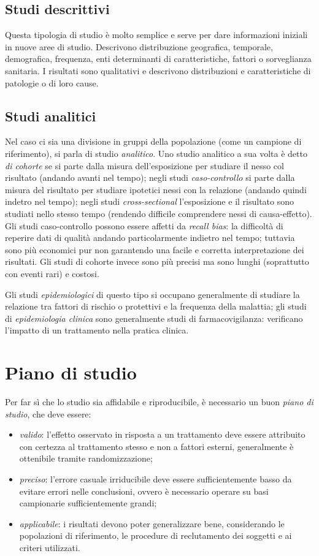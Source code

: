 \documentclass[a4page, twocolumn]{article}
\begin{document}
\subsection{Studi descrittivi}
Questa tipologia di studio è molto semplice e serve per dare informazioni iniziali in nuove aree di studio.
Descrivono distribuzione geografica, temporale, demografica, frequenza, enti determinanti di caratteristiche, fattori o sorveglianza sanitaria.
I risultati sono qualitativi e descrivono distribuzioni e caratteristiche di patologie o di loro cause.

\subsection{Studi analitici}
Nel caso ci sia una divisione in gruppi della popolazione (come un campione di riferimento), si parla di studio \textit{analitico}.
Uno studio analitico a sua volta è detto \textit{di cohorte} se si parte dalla misura dell'esposizione per studiare il nesso col risultato (andando avanti nel tempo); negli studi \textit{caso-controllo} si parte dalla misura del risultato per studiare ipotetici nessi con la relazione (andando quindi indetro nel tempo); negli studi \textit{cross-sectional} l'esposizione e il risultato sono studiati nello stesso tempo (rendendo difficile comprendere nessi di causa-effetto).
Gli studi caso-controllo possono essere affetti da \textit{recall bias}: la difficoltà di reperire dati di qualità andando particolarmente indietro nel tempo; tuttavia sono più economici pur non garantendo una facile e corretta interpretazione dei risultati.
Gli studi di cohorte invece sono più precisi ma sono lunghi (soprattutto con eventi rari) e costosi.

Gli studi \textit{epidemiologici} di questo tipo si occupano generalmente di studiare la relazione tra fattori di rischio o protettivi e la frequenza della malattia; gli studi di \textit{epidemiologia clinica} sono generalmente studi di farmacovigilanza: verificano l'impatto di un trattamento nella pratica clinica.

\section{Piano di studio}
Per far sì che lo studio sia affidabile e riproducibile, è necessario un buon \textit{piano di studio}, che deve essere:
\begin{itemize}
\item \textit{valido}: l'effetto osservato in risposta a un trattamento deve essere attribuito con certezza al trattamento stesso e non a fattori esterni, generalmente è ottenibile tramite randomizzazione;
\item \textit{preciso}: l'errore casuale irriducibile deve essere sufficientemente basso da evitare errori nelle conclusioni, ovvero è necessario operare su basi campionarie sufficientemente grandi;
\item \textit{applicabile}: i risultati devono poter generalizzare bene, considerando le popolazioni di riferimento, le procedure di reclutamento dei soggetti e ai criteri utilizzati.
\end{itemize}
\end{document}
